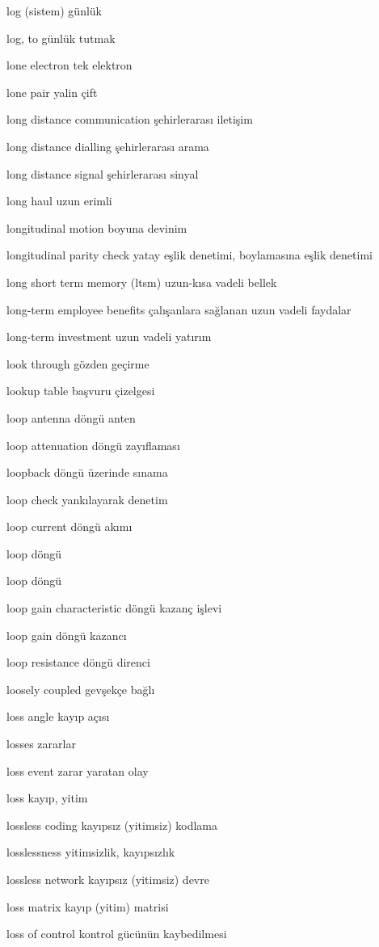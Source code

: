 \documentclass[12pt,fleqn]{article}\usepackage{../../common}
\begin{document}
log (sistem) günlük

log, to günlük tutmak

lone electron tek elektron

lone pair yalin çift

long distance communication şehirlerarası iletişim

long distance dialling şehirlerarası arama

long distance signal şehirlerarası sinyal

long haul uzun erimli

longitudinal motion boyuna devinim

longitudinal parity check yatay eşlik denetimi, boylamasına eşlik denetimi

long short term memory (ltsm) uzun-kısa vadeli bellek

long-term employee benefits çalışanlara sağlanan uzun vadeli faydalar

long-term investment uzun vadeli yatırım

look through gözden geçirme

lookup table başvuru çizelgesi

loop antenna döngü anten

loop attenuation döngü zayıflaması

loopback döngü üzerinde sınama

loop check yankılayarak denetim

loop current döngü akımı

loop döngü

loop döngü

loop gain characteristic döngü kazanç işlevi

loop gain döngü kazancı

loop resistance döngü direnci

loosely coupled gevşekçe bağlı

loss angle kayıp açısı

losses zararlar

loss event zarar yaratan olay

loss kayıp, yitim

lossless coding kayıpsız (yitimsiz) kodlama

losslessness yitimsizlik, kayıpsızlık

lossless network kayıpsız (yitimsiz) devre

loss matrix kayıp (yitim) matrisi

loss of control kontrol gücünün kaybedilmesi
\end{document}

